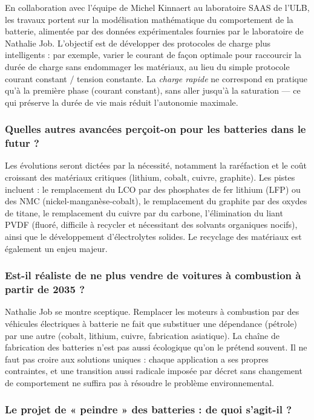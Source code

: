 En collaboration avec l'équipe de Michel Kinnaert au laboratoire SAAS de l'ULB, les travaux portent sur la modélisation mathématique du comportement de la batterie, alimentée par des données expérimentales fournies par le laboratoire de Nathalie Job. L'objectif est de développer des protocoles de charge plus intelligents : par exemple, varier le courant de façon optimale pour raccourcir la durée de charge sans endommager les matériaux, au lieu du simple protocole courant constant / tension constante. La \textit{charge rapide} ne correspond en pratique qu'à la première phase (courant constant), sans aller jusqu'à la saturation — ce qui préserve la durée de vie mais réduit l'autonomie maximale.

\subsubsection{Quelles autres avancées perçoit-on pour les batteries dans le futur ?}

Les évolutions seront dictées par la nécessité, notamment la raréfaction et le coût croissant des matériaux critiques (lithium, cobalt, cuivre, graphite). Les pistes incluent : le remplacement du LCO par des phosphates de fer lithium (LFP) ou des NMC (nickel-manganèse-cobalt), le remplacement du graphite par des oxydes de titane, le remplacement du cuivre par du carbone, l'élimination du liant PVDF (fluoré, difficile à recycler et nécessitant des solvants organiques nocifs), ainsi que le développement d'électrolytes solides. Le recyclage des matériaux est également un enjeu majeur.

\subsubsection{Est-il réaliste de ne plus vendre de voitures à combustion à partir de 2035 ?}

Nathalie Job se montre sceptique. Remplacer les moteurs à combustion par des véhicules électriques à batterie ne fait que substituer une dépendance (pétrole) par une autre (cobalt, lithium, cuivre, fabrication asiatique). La chaîne de fabrication des batteries n'est pas aussi écologique qu'on le prétend souvent. Il ne faut pas croire aux solutions uniques : chaque application a ses propres contraintes, et une transition aussi radicale imposée par décret sans changement de comportement ne suffira pas à résoudre le problème environnemental.

\subsubsection{Le projet de « peindre » des batteries : de quoi s'agit-il ?}

